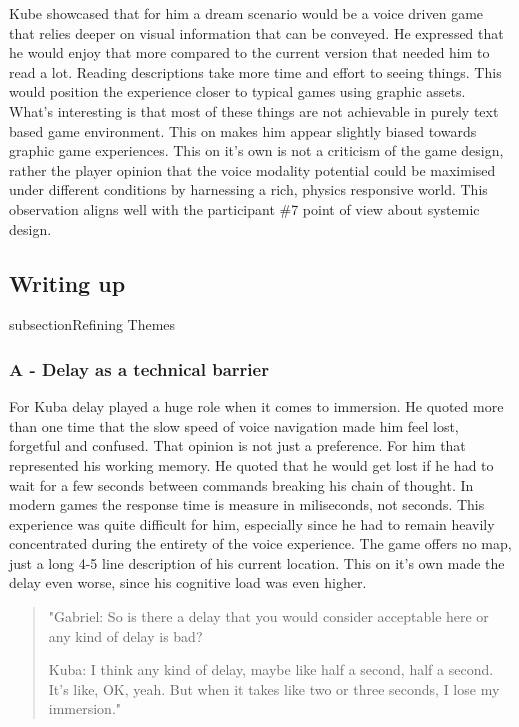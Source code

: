 Kube showcased that for him a dream scenario would be a voice driven game that relies deeper on visual information that can be conveyed. He expressed that he would enjoy that more compared to the current version that needed him to read a lot. Reading descriptions take more time and effort to seeing things. This would position the experience closer to typical games using graphic assets. What's interesting is that most of these things are not achievable in purely text based game environment. This on makes him appear slightly biased towards graphic game experiences. This on it's own is not a criticism of the game design, rather the player opinion that the voice modality potential could be maximised under different conditions by harnessing a rich, physics responsive world. This observation aligns well with the participant \#7 point of view about systemic design. 




\subsection{Writing up}

subsection{Refining Themes}

\subsubsection{A - Delay as a technical barrier}

For Kuba delay played a huge role when it comes to immersion. He quoted more than one time that the slow speed of voice navigation made him feel lost, forgetful and confused. That opinion is not just a preference. For him that represented his working memory. He quoted that he would get lost if he had to wait for a few seconds between commands breaking his chain of thought. In modern games the response time is measure in miliseconds, not seconds. This experience was quite difficult for him, especially since he had to remain heavily concentrated during the entirety of the voice experience. The game offers no map, just a long 4-5 line description of his current location. This on it's own made the delay even worse, since his cognitive load was even higher. 

\begin{quote}
   "Gabriel: So is there a delay that you would consider acceptable here or any kind of delay is bad?
   
    Kuba: I think any kind of delay, maybe like half a second, half a second.
    It's like, OK, yeah.
    But when it takes like two or three seconds, I lose my immersion."
    \end{quote}


